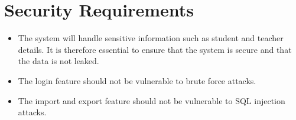\documentclass{scrreprt}
\begin{document}

\section{Security Requirements}
\begin{itemize}
    \item The system will handle sensitive information such as student and teacher details.
        It is therefore essential to ensure that the system is secure and that the data is not leaked.
    \item The login feature should not be vulnerable to brute force attacks.
    \item The import and export feature should not be vulnerable to SQL injection attacks.
\end{itemize}

\end{document}

